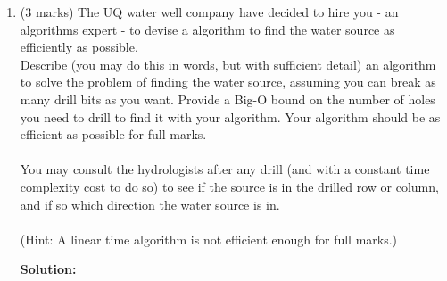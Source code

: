 \documentclass[a4,13pt]{extarticle}
\newenvironment{Solution}{\color{blue}\textbf{Solution:}}{}
\begin{document}
\begin{enumerate}
	      \begin{enumerate} 
	      	\item (3 marks) The UQ water well company have decided to hire you - an algorithms expert - to devise a algorithm 
	      	      to find the water source as efficiently as possible. \\
	      	      	      	              
	      	      Describe (you may do this in words, but with sufficient detail) an algorithm to solve the problem of finding the water source, 
	      	      assuming you can break as many drill bits as you want. Provide a Big-O bound on the number of holes you need to drill to find 
	      	      it with your algorithm. Your algorithm should be as efficient as possible for full marks.\\\\
	      	      You may consult the hydrologists after any drill (and with a constant time complexity cost to do so) to see if 
	      	      the source is in the drilled row or column, and if so which direction the water source is in.\\\\
	      	      (Hint: A linear time algorithm is not efficient enough for full marks.)
	      	      
			\begin{Solution}


\end{Solution}
\end{enumerate}
\end{enumerate}
\end{document}
